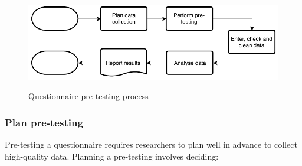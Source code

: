 \begin{figure}[htb]
\myfloatalign
{\includegraphics[width=0.9\linewidth]{gfx/standard/quesPretesting}} \quad
\caption[Questionnaire pre-testing process]{Questionnaire pre-testing process}\label{fig_quesPretesting}
\end{figure}

\subsubsection{Plan pre-testing}
Pre-testing a questionnaire requires researchers to plan well in advance to collect high-quality data. Planning a pre-testing involves deciding:

